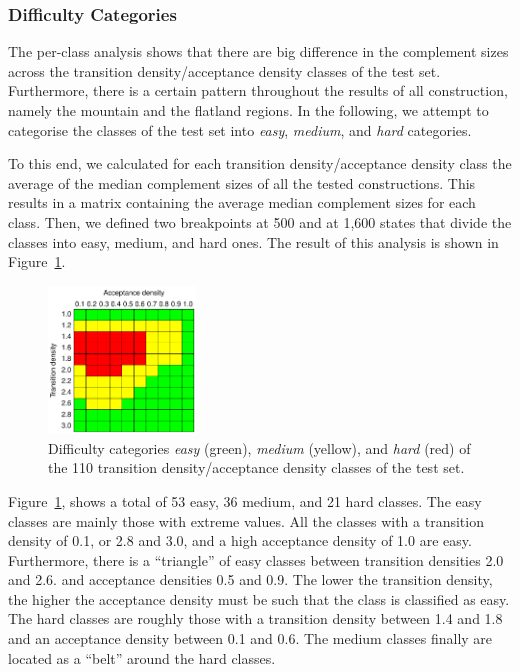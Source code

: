\subsubsection{Difficulty Categories}
The per-class analysis shows that there are big difference in the complement sizes across the transition density/acceptance density classes of the \goal{} test set. Furthermore, there is a certain pattern throughout the results of all construction, namely the mountain and the flatland regions. In the following, we attempt to categorise the classes of the \goal{} test set into \textit{easy}, \textit{medium}, and \textit{hard} categories. 

To this end, we calculated for each transition density/acceptance density class the average of the median complement sizes of all the tested constructions. This results in a matrix containing the average median complement sizes for each class. Then, we defined two breakpoints at 500 and at 1,600 states that divide the classes into easy, medium, and hard ones. The result of this analysis is shown in Figure~\ref{i.g.difficulty}.

\begin{figure}[ht]
\centering
\includegraphics[width=0.35\textwidth]{../results/figures/internal/goal/difficulty.pdf}
\caption{Difficulty categories \textit{easy} (green), \textit{medium} (yellow), and \textit{hard} (red) of the 110 transition density/acceptance density classes of the \goal{} test set.}
\label{i.g.difficulty}
\end{figure}

Figure~\ref{i.g.difficulty}, shows a total of  53 easy, 36 medium, and 21 hard classes. The easy classes are mainly those with extreme values. All the classes with a transition density of 0.1, or 2.8 and 3.0, and a high acceptance density of 1.0 are easy. Furthermore, there is a ``triangle'' of easy classes between transition densities 2.0 and 2.6. and acceptance densities 0.5 and 0.9. The lower the transition density, the higher the acceptance density must be such that the class is classified as easy. The hard classes are roughly those with a transition density between 1.4 and 1.8 and an acceptance density between 0.1 and 0.6. The medium classes finally are located as a ``belt'' around the hard classes.

